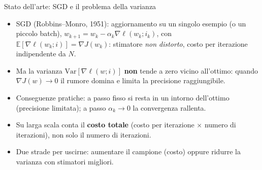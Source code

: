 \documentclass[aspectratio=169,11pt]{beamer}
\begin{document}
\begin{frame}{Stato dell'arte: SGD e il problema della varianza}
  \begin{itemize}
    \item SGD (Robbins--Monro, 1951): aggiornamento su un singolo esempio
      (o un piccolo batch),
      $w_{k+1}=w_k-\alpha_k\nabla\ell(w_k;i_k)$, con
      $\mathbb{E}[\nabla\ell(w_k;i)]=\nabla J(w_k)$: stimatore
      \emph{non distorto}, costo per iterazione indipendente da $N$.
    \item Ma la varianza $\mathrm{Var}[\nabla\ell(w;i)]$ \textbf{non} tende a
      zero vicino all'ottimo: quando $\nabla J(w)\to 0$ il rumore domina e
      limita la precisione raggiungibile.
    \item Conseguenze pratiche: a passo fisso si resta in un intorno
      dell'ottimo (precisione limitata); a passo $\alpha_k\to 0$ la
      convergenza rallenta.
    \item Su larga scala conta il \textbf{costo totale} (costo per iterazione
      $\times$ numero di iterazioni), non solo il numero di iterazioni.
    \item Due strade per uscirne: aumentare il campione (costo) oppure
      ridurre la varianza con stimatori migliori.
  \end{itemize}
\end{frame}
\end{document}
